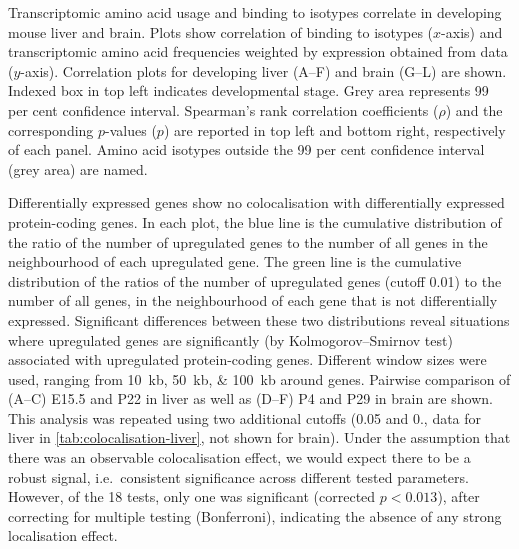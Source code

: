 \thispagestyle{empty}
    {Transcriptomic \mrna amino acid usage and  binding to \trna isotypes
    correlate in developing mouse liver and brain.}
    {Plots show correlation of  binding to \trna isotypes (\(x\)-axis) and
    transcriptomic amino acid frequencies weighted by expression obtained from
    \rnaseq data (\(y\)-axis). Correlation plots for developing liver (A–F) and
    brain (G–L) are shown. Indexed box in top left indicates developmental
    stage. Grey area represents \num{99} per cent confidence interval.
    Spearman’s rank correlation coefficients (\(\rho\)) and the corresponding
    \(p\)-values (\(p\)) are reported in top left and bottom right, respectively
    of each panel. Amino acid isotypes outside the \num{99} per cent confidence
    interval (grey area) are named.}



    {Differentially expressed \trna genes show no colocalisation with
    differentially expressed protein-coding genes.}
    {In each plot, the blue line is the cumulative distribution of the ratio of
    the number of upregulated \mrna genes to the number of all \mrna genes in
    the neighbourhood of each upregulated \trna gene. The green line is the
    cumulative distribution of the ratios of the number of upregulated \mrna
    genes (\fdr cutoff \num{0.01}) to the number of all \mrna genes, in the
    neighbourhood of each \trna gene that is not differentially expressed.
    Significant differences between these two distributions reveal situations
    where upregulated \trna genes are significantly (by Kolmogorov–Smirnov test)
    associated with upregulated protein-coding genes. Different window sizes
    were used, ranging from \SIlist{10;50;100}{kb} around \trna genes. Pairwise
    comparison of (A–C) E15.5 and P22 in liver as well as (D–F) P4 and P29 in
    brain are shown. This analysis was repeated using two additional \fdr
    cutoffs (\num{0.05} and \num{0.}, data for liver in
    \cref{tab:colocalisation-liver}, not shown for brain). Under the assumption
    that there was an observable colocalisation effect, we would expect there to
    be a robust signal, i.e.\ consistent significance across different tested
    parameters. However, of the \num{18} tests, only one was significant
    (corrected \(p<0.013\)), after correcting for multiple testing (Bonferroni),
    indicating the absence of any strong localisation effect.}

